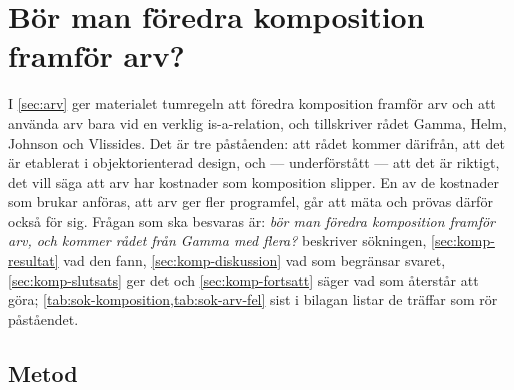

\chapter{Bör man föredra komposition framför arv?}
\label{app:komposition}

I \cref{sec:arv} ger materialet tumregeln att föredra komposition
framför arv och att använda arv bara vid en verklig
\foreignlanguage{english}{is-a}-relation, och tillskriver rådet Gamma,
Helm, Johnson och Vlissides\autocite{Gamma1994DesignPatterns}.
Det är tre påståenden: att rådet kommer därifrån, att det är etablerat i
objektorienterad design, och --- underförstått --- att det är riktigt,
det vill säga att arv har kostnader som komposition slipper.  En av de
kostnader som brukar anföras, att arv ger fler programfel, går att mäta
och prövas därför också för sig.  Frågan som ska besvaras är:
\emph{bör man föredra komposition framför arv, och kommer rådet från
Gamma med flera?}   beskriver
sökningen, \cref{sec:komp-resultat} vad den fann,
\cref{sec:komp-diskussion} vad som begränsar svaret,
\cref{sec:komp-slutsats} ger det och \cref{sec:komp-fortsatt} säger vad
som återstår att göra; \cref{tab:sok-komposition,tab:sok-arv-fel}
sist i bilagan listar de träffar som rör påståendet.

\section{Metod}
\label{sec:komp-metod}

